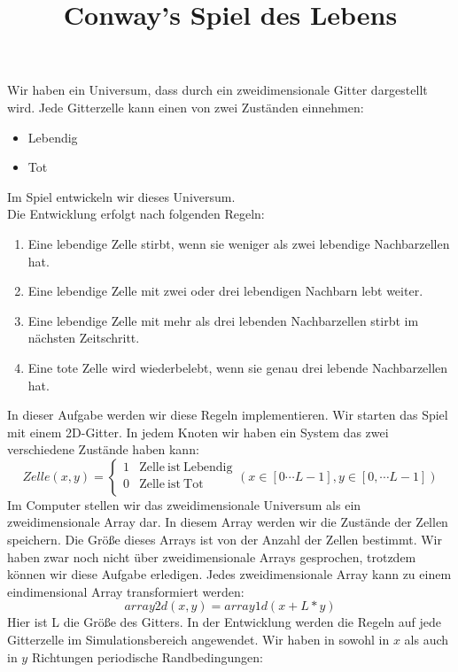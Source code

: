 \documentclass{article}[12pt]
\title{Conway's Spiel des Lebens}
\begin{document}
\maketitle
Wir haben ein Universum, dass durch ein zweidimensionale Gitter dargestellt wird. Jede Gitterzelle kann einen von zwei
Zust\"anden einnehmen:
\begin{itemize}
\item Lebendig
\item Tot
\end{itemize}
Im Spiel entwickeln wir dieses Universum.\\
Die Entwicklung erfolgt nach folgenden Regeln:
\begin{enumerate}
\item Eine lebendige Zelle stirbt, wenn sie weniger als zwei lebendige Nachbarzellen hat.
\item Eine lebendige Zelle mit zwei oder drei lebendigen Nachbarn lebt weiter.
\item Eine lebendige Zelle mit mehr als drei lebenden Nachbarzellen stirbt im nächsten Zeitschritt.
\item Eine tote Zelle wird wiederbelebt, wenn sie genau drei lebende Nachbarzellen hat.
\end{enumerate}
In dieser Aufgabe werden wir diese Regeln implementieren. Wir starten das Spiel mit einem 2D-Gitter. In jedem Knoten wir haben
ein System das zwei verschiedene Zustände haben kann:
\begin{equation}
Zelle(x,y) = \left\{\begin{array}{rc} 1 & \mathrm{Zelle~ist~Lebendig} \\0  & \mathrm{Zelle~ist~Tot} \\
\end{array}\right. (x\in[0\cdots L-1], y\in[0,\cdots L-1])
\end{equation}
Im Computer stellen wir das zweidimensionale Universum als ein zweidimensionale Array dar. In diesem Array werden wir die Zustände der Zellen speichern. Die Größe dieses Arrays ist von der Anzahl der Zellen bestimmt. 
Wir haben zwar noch nicht über zweidimensionale Arrays gesprochen, trotzdem können wir diese Aufgabe erledigen. Jedes zweidimensionale Array
kann zu einem eindimensional Array transformiert werden:
\begin{equation}
array2d(x,y)= array1d(x+L*y)
\end{equation}
Hier ist L die Größe des Gitters. In der Entwicklung werden die Regeln auf jede Gitterzelle im Simulationsbereich angewendet.
Wir haben in sowohl in $x$ als auch in $y$ Richtungen periodische Randbedingungen:
\end{document}
